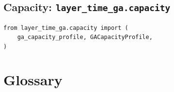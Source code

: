 \documentclass[11pt, twoside, openright]{memoir}
\begin{document}
\section{Capacity: \texttt{layer\_time\_ga.capacity}}

\begin{lstlisting}
from layer_time_ga.capacity import (
    ga_capacity_profile, GACapacityProfile,
)
\end{lstlisting}



\backmatter

\chapter*{Glossary}
\end{document}
